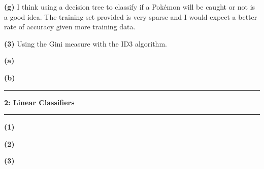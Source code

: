 \documentclass[11pt]{article}
\newcommand\question[2]{\vspace{.25in}\hrule\textbf{#1: #2}\vspace{.5em}\hrule\vspace{.10in}}
\renewcommand\part[1]{\vspace{.10in}\textbf{(#1)}}
\begin{document}
\part{g} I think using a decision tree to classify if a Pok\'{e}mon will be caught or not is a good idea. The training set provided is very sparse and I would expect a better rate of accuracy given more training data.

\part{3} Using the Gini measure with the ID3 algorithm.

\qquad \part{a}

\qquad \part{b}

\question{2}{Linear Classifiers}

\part{1}

\part{2}

\part{3}
\end{document}
